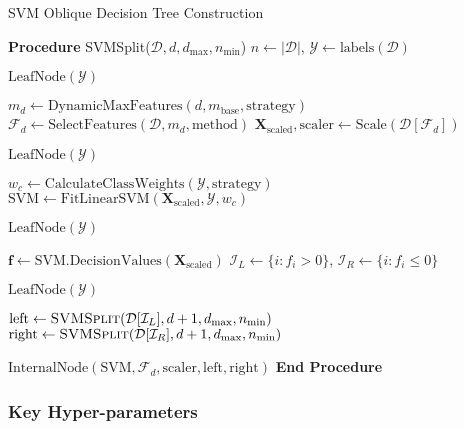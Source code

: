 \begin{algorithm}
\caption{SVM Oblique Decision Tree Construction}
\label{alg:svmodt}
\begin{algorithmic}[1]
\STATE \textbf{Procedure} SVMSplit($\mathcal{D}, d, d_{\max}, n_{\min}$)
    \STATE $n \gets |\mathcal{D}|$, $\mathcal{Y} \gets \text{labels}(\mathcal{D})$
    
        \RETURN $\text{LeafNode}(\mathcal{Y})$ 
    \ENDIF
    
    \STATE $m_d \gets \text{DynamicMaxFeatures}(d, m_{\text{base}}, \text{strategy})$
    \STATE $\mathcal{F}_d \gets \text{SelectFeatures}(\mathcal{D}, m_d, \text{method})$
    \STATE $\mathbf{X}_{\text{scaled}}, \text{scaler} \gets \text{Scale}(\mathcal{D}[\mathcal{F}_d])$
    
        \RETURN $\text{LeafNode}(\mathcal{Y})$ 
    \ENDIF
    
    \STATE $w_c \gets \text{CalculateClassWeights}(\mathcal{Y}, \text{strategy})$
    \STATE $\text{SVM} \gets \text{FitLinearSVM}(\mathbf{X}_{\text{scaled}}, \mathcal{Y}, w_c)$
    
        \RETURN $\text{LeafNode}(\mathcal{Y})$ 
    \ENDIF
    
    \STATE $\mathbf{f} \gets \text{SVM.DecisionValues}(\mathbf{X}_{\text{scaled}})$
    \STATE $\mathcal{I}_L \gets \{i : f_i > 0\}$, $\mathcal{I}_R \gets \{i : f_i \leq 0\}$
    
        \RETURN $\text{LeafNode}(\mathcal{Y})$ 
    \ENDIF
    
    \STATE $\text{left} \gets \textsc{SVMSplit}(\mathcal{D}[\mathcal{I}_L], d+1, d_{\max}, n_{\min})$
    \STATE $\text{right} \gets \textsc{SVMSplit}(\mathcal{D}[\mathcal{I}_R], d+1, d_{\max}, n_{\min})$
    
    \RETURN $\text{InternalNode}(\text{SVM}, \mathcal{F}_d, \text{scaler}, \text{left}, \text{right})$
\STATE \textbf{End Procedure}
\end{algorithmic}
\end{algorithm}

\subsubsection{Key Hyper-parameters}\label{key-hyper-parameters}

